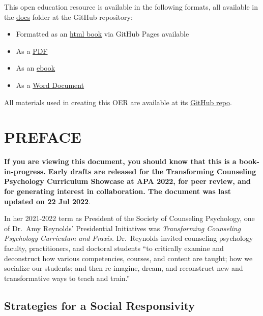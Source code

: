 \documentclass[
  11pt,
]{book}
\providecommand{\tightlist}{%
  \setlength{\itemsep}{0pt}\setlength{\parskip}{0pt}}
\begin{document}
This open education resource is available in the following formats, all available in the \href{https://github.com/lhbikos/TransformingResearchMethods/tree/main/docs}{docs} folder at the GitHub repository:

\begin{itemize}
\tightlist
\item
  Formatted as an \href{https://lhbikos.github.io/TransformingResearchMethods/}{html book} via GitHub Pages available
\item
  As a \href{https://github.com/lhbikos/TransformingResearchMethods/blob/main/docs/TransformingResearchMethods.pdf}{PDF}
\item
  As an \href{https://github.com/lhbikos/TransformingResearchMethods/blob/main/docs/TransformingResearchMethods.epub}{ebook}
\item
  As a \href{https://github.com/lhbikos/TransformingResearchMethods/blob/main/docs/TransformingResearchMethods.docx}{Word Document}
\end{itemize}

All materials used in creating this OER are available at its \href{https://github.com/lhbikos/TransformingResearchMethods}{GitHub repo}.

\hypertarget{preface}{%
\chapter*{PREFACE}\label{preface}}

\textbf{If you are viewing this document, you should know that this is a book-in-progress. Early drafts are released for the Transforming Counseling Psychology Curriculum Showcase at APA 2022, for peer review, and for generating interest in collaboration. The document was last updated on 22 Jul 2022}.

In her 2021-2022 term as President of the Society of Counseling Psychology, one of Dr.~Amy Reynolds' Presidential Initiatives was \emph{Transforming Counseling Psychology Curriculum and Praxis.} Dr.~Reynolds invited counseling psychology faculty, practitioners, and doctoral students ``to critically examine and deconstruct how various competencies, courses, and content are taught; how we socialize our students; and then re-imagine, dream, and reconstruct new and transformative ways to teach and train.''

\hypertarget{strategies-for-a-social-responsivity}{%
\section*{Strategies for a Social Responsivity}\label{strategies-for-a-social-responsivity}}
\end{document}
